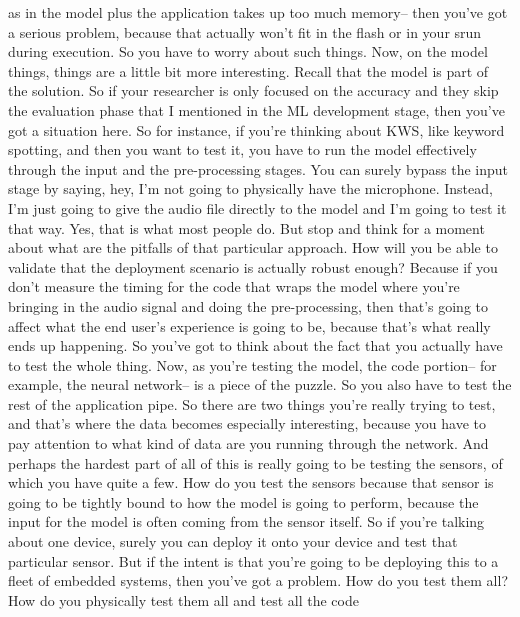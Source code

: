 {{{    as in the model plus the application takes up too much memory--
    then you've got a serious problem, because that actually
    won't fit in the flash or in your srun during execution.
    So you have to worry about such things.
    Now, on the model things, things are a little bit more interesting.
    Recall that the model is part of the solution.
    So if your researcher is only focused on the accuracy
    and they skip the evaluation phase that I mentioned in the ML development
    stage, then you've got a situation here.
    So for instance, if you're thinking about KWS, like keyword spotting,
    and then you want to test it, you have to run the model effectively
    through the input and the pre-processing stages.
    You can surely bypass the input stage by saying, hey,
    I'm not going to physically have the microphone.
    Instead, I'm just going to give the audio file directly to the model
    and I'm going to test it that way.
    Yes, that is what most people do.
    But stop and think for a moment about what
    are the pitfalls of that particular approach.
    How will you be able to validate that the deployment scenario is actually
    robust enough?
    Because if you don't measure the timing for the code that
    wraps the model where you're bringing in the audio signal
    and doing the pre-processing, then that's
    going to affect what the end user's experience is going to be,
    because that's what really ends up happening.
    So you've got to think about the fact that you actually
    have to test the whole thing.
    Now, as you're testing the model, the code portion-- for example,
    the neural network-- is a piece of the puzzle.
    So you also have to test the rest of the application pipe.
    So there are two things you're really trying to test,
    and that's where the data becomes especially interesting, because you
    have to pay attention to what kind of data are you
    running through the network.
    And perhaps the hardest part of all of this
    is really going to be testing the sensors, of which you have quite a few.
    How do you test the sensors because that sensor
    is going to be tightly bound to how the model is going to perform,
    because the input for the model is often coming from the sensor itself.
    So if you're talking about one device, surely you
    can deploy it onto your device and test that particular sensor.
    But if the intent is that you're going to be deploying this
    to a fleet of embedded systems, then you've got a problem.
    How do you test them all?
    How do you physically test them all and test all the code
}}}
